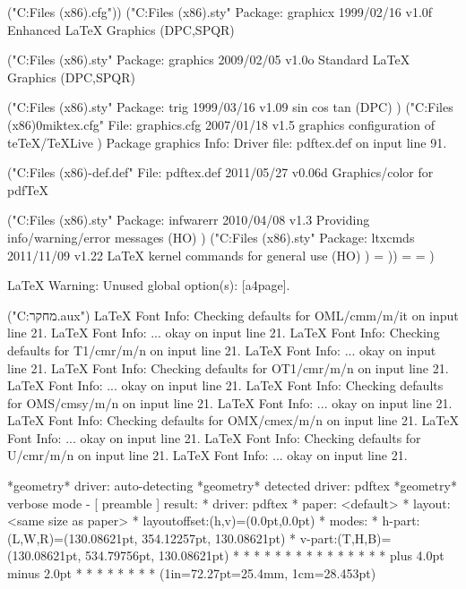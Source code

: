 ("C:\Program Files (x86)\tex\latex\geometry\geometry.cfg"))
("C:\Program Files (x86)\tex\latex\graphics\graphicx.sty"
Package: graphicx 1999/02/16 v1.0f Enhanced LaTeX Graphics (DPC,SPQR)

("C:\Program Files (x86)\tex\latex\graphics\graphics.sty"
Package: graphics 2009/02/05 v1.0o Standard LaTeX Graphics (DPC,SPQR)

("C:\Program Files (x86)\tex\latex\graphics\trig.sty"
Package: trig 1999/03/16 v1.09 sin cos tan (DPC)
)
("C:\Program Files (x86)\tex\latex\00miktex\graphics.cfg"
File: graphics.cfg 2007/01/18 v1.5 graphics configuration of teTeX/TeXLive
)
Package graphics Info: Driver file: pdftex.def on input line 91.

("C:\Program Files (x86)\tex\latex\pdftex-def\pdftex.def"
File: pdftex.def 2011/05/27 v0.06d Graphics/color for pdfTeX

("C:\Program Files (x86)\tex\generic\oberdiek\infwarerr.sty"
Package: infwarerr 2010/04/08 v1.3 Providing info/warning/error messages (HO)
)
("C:\Program Files (x86)\tex\generic\oberdiek\ltxcmds.sty"
Package: ltxcmds 2011/11/09 v1.22 LaTeX kernel commands for general use (HO)
)
\Gread@gobject=
))
\Gin@req@height=
\Gin@req@width=
)

LaTeX Warning: Unused global option(s):
    [a4page].

("C:\Users\ran\Dropbox\Kinect{} מחקר\prop.aux")
LaTeX Font Info:    Checking defaults for OML/cmm/m/it on input line 21.
LaTeX Font Info:    ... okay on input line 21.
LaTeX Font Info:    Checking defaults for T1/cmr/m/n on input line 21.
LaTeX Font Info:    ... okay on input line 21.
LaTeX Font Info:    Checking defaults for OT1/cmr/m/n on input line 21.
LaTeX Font Info:    ... okay on input line 21.
LaTeX Font Info:    Checking defaults for OMS/cmsy/m/n on input line 21.
LaTeX Font Info:    ... okay on input line 21.
LaTeX Font Info:    Checking defaults for OMX/cmex/m/n on input line 21.
LaTeX Font Info:    ... okay on input line 21.
LaTeX Font Info:    Checking defaults for U/cmr/m/n on input line 21.
LaTeX Font Info:    ... okay on input line 21.

*geometry* driver: auto-detecting
*geometry* detected driver: pdftex
*geometry* verbose mode - [ preamble ] result:
* driver: pdftex
* paper: <default>
* layout: <same size as paper>
* layoutoffset:(h,v)=(0.0pt,0.0pt)
* modes: 
* h-part:(L,W,R)=(130.08621pt, 354.12257pt, 130.08621pt)
* v-part:(T,H,B)=(130.08621pt, 534.79756pt, 130.08621pt)
* \paperwidth=614.295pt
* \paperheight=794.96999pt
* \textwidth=354.12257pt
* \textheight=534.79756pt
* \oddsidemargin=57.81622pt
* \evensidemargin=57.81622pt
* \topmargin=57.81622pt
* \headheight=0.0pt
* \headsep=0.0pt
* \topskip=10.0pt
* \footskip=30.0pt
* \marginparwidth=65.0pt
* \marginparsep=11.0pt
* \columnsep=10.0pt
* \skip\footins=9.0pt plus 4.0pt minus 2.0pt
* \hoffset=0.0pt
* \voffset=0.0pt
* 
* \@twocolumnfalse
* \@twosidefalse
* \@mparswitchfalse
* \@reversemarginfalse
* (1in=72.27pt=25.4mm, 1cm=28.453pt)

